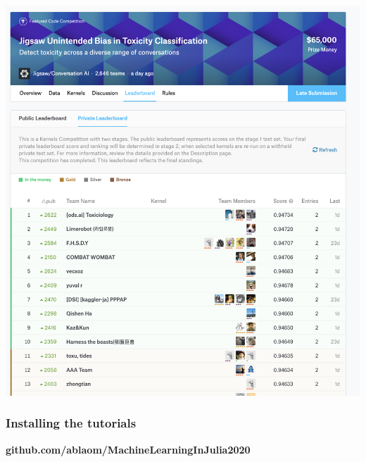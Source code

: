 \documentclass[t]{beamer}
\newcommand\df{\bf\color{Maroon}}
\begin{document}
\begin{frame}
\begin{center}
      \includegraphics[scale=0.16]{kaggle3.png}
  \end{center}
\end{frame}

\begin{frame}
  \frametitle{Installing the tutorials}
  \vspace{4\baselineskip}
  \begin{center}
    \Large \df github.com/ablaom/MachineLearningInJulia2020
  \end{center}
\end{frame}


\begin{frame}
	\finalpage
\end{frame}
\end{document}
